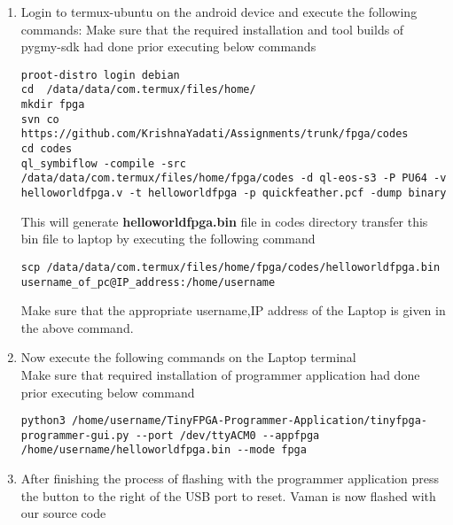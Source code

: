 \documentclass[10pt, a4paper]{article}
\begin{document}
\begin{enumerate}
\item Login to termux-ubuntu on the android device and execute the following commands:
\vspace{10mm}
Make sure that the required installation and tool builds of pygmy-sdk had done prior executing below commands\\

\begin{lstlisting}
proot-distro login debian
cd  /data/data/com.termux/files/home/
mkdir fpga
svn co https://github.com/KrishnaYadati/Assignments/trunk/fpga/codes
cd codes
ql_symbiflow -compile -src /data/data/com.termux/files/home/fpga/codes -d ql-eos-s3 -P PU64 -v helloworldfpga.v -t helloworldfpga -p quickfeather.pcf -dump binary
\end{lstlisting}
This will generate \textbf{helloworldfpga.bin} file in codes directory transfer this bin file to laptop by executing the following command\\
\vspace{2mm}
\begin{lstlisting}
scp /data/data/com.termux/files/home/fpga/codes/helloworldfpga.bin username_of_pc@IP_address:/home/username
\end{lstlisting}
Make sure that the appropriate username,IP address of the Laptop is given in the above command.\\
\vspace{5mm}
\item Now execute the following commands on the Laptop terminal\\
Make sure that required installation of programmer application had done prior executing below command\\
\vspace{5mm}
\begin{lstlisting}
python3 /home/username/TinyFPGA-Programmer-Application/tinyfpga-programmer-gui.py --port /dev/ttyACM0 --appfpga /home/username/helloworldfpga.bin --mode fpga
\end{lstlisting}
\vspace{5mm}
\item After finishing the process of flashing with the programmer application press the button to the right of the USB port to reset. Vaman is now flashed with our source code
\end{enumerate}
\end{document}
